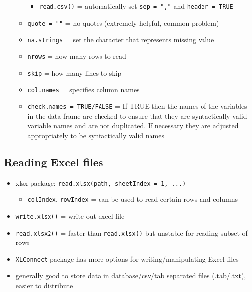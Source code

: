 \documentclass[
]{article}
\providecommand{\tightlist}{%
  \setlength{\itemsep}{0pt}\setlength{\parskip}{0pt}}
\begin{document}
\begin{itemize}
\begin{itemize}
    \begin{itemize}
    \tightlist
    \item
      \texttt{read.csv()} = automatically set \texttt{sep\ =\ ","} and
      \texttt{header\ =\ TRUE}
    \end{itemize}
  \item
    \texttt{quote\ =\ ""} = no quotes (extremely helpful, common
    problem)
  \item
    \texttt{na.strings} = set the character that represents missing
    value
  \item
    \texttt{nrows} = how many rows to read
  \item
    \texttt{skip} = how many lines to skip
  \item
    \texttt{col.names} = specifies column names
  \item
    \texttt{check.names\ =\ TRUE/FALSE} = If TRUE then the names of the
    variables in the data frame are checked to ensure that they are
    syntactically valid variable names and are not duplicated. If
    necessary they are adjusted appropriately to be syntactically valid
    names
  \end{itemize}
\end{itemize}

\hypertarget{reading-excel-files}{%
\subsection{Reading Excel files}\label{reading-excel-files}}

\begin{itemize}
\tightlist
\item
  xlsx package: \texttt{read.xlsx(path,\ sheetIndex\ =\ 1,\ ...)}

  \begin{itemize}
  \tightlist
  \item
    \texttt{colIndex}, \texttt{rowIndex} = can be used to read certain
    rows and columns
  \end{itemize}
\item
  \texttt{write.xlsx()} = write out excel file
\item
  \texttt{read.xlsx2()} = faster than \texttt{read.xlsx()} but unstable
  for reading subset of rows
\item
  \texttt{XLConnect} package has more options for writing/manipulating
  Excel files
\item
  generally good to store data in database/csv/tab separated files
  (.tab/.txt), easier to distribute
\end{itemize}
\end{document}
